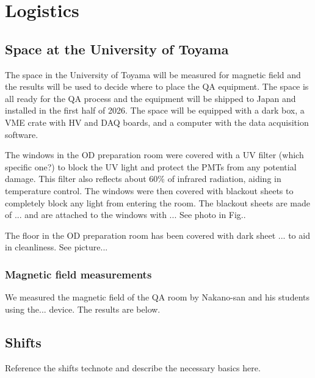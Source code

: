 \documentclass[12pt,a4paper]{article}
\begin{document}
\section{Logistics}
\subsection{Space at the University of Toyama}

The space in the University of Toyama will be measured for magnetic field and the results will be used to decide where to place the QA equipment. The space is all ready for the QA process and the equipment will be shipped to Japan and installed in the first half of 2026. The space will be equipped with a dark box, a VME crate with HV and DAQ boards, and a computer with the data acquisition software.

The windows in the OD preparation room were covered with a UV filter (which specific one?) to block the UV light and protect the PMTs from any potential damage. This filter also reflects about 60\% of infrared radiation, aiding in temperature control. The windows were then covered with blackout sheets to completely block any light from entering the room. The blackout sheets are made of ... and are attached to the windows with ...  See photo in Fig..

The floor in the OD preparation room has been covered with dark sheet ... to aid in cleanliness. See picture...

\subsubsection{Magnetic field measurements}
We measured the magnetic field of the QA room by Nakano-san and his students using the... device. The results are below.

\subsection{Shifts}
Reference the shifts technote and describe the necessary basics here.
\end{document}
